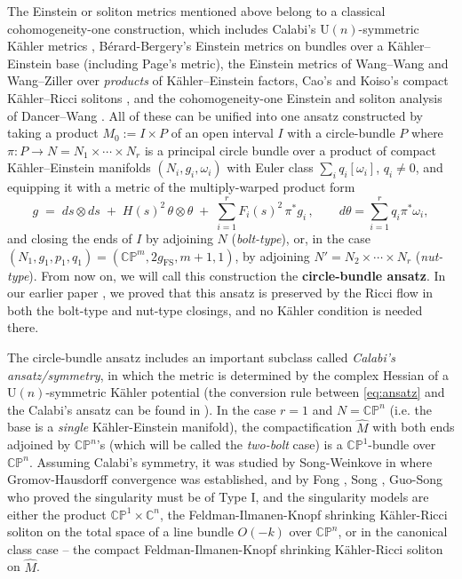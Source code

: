 \documentclass[11pt]{amsart}
\theoremstyle{plain}
\numberwithin{equation}{section}
\theoremstyle{definition}
\theoremstyle{remark}
\begin{document}
The Einstein or soliton metrics mentioned above belong to a classical cohomogeneity-one construction, which includes Calabi's $\mathrm{U} ( n )$-symmetric K\"ahler metrics \cite{Calabi}, B\'erard-Bergery's Einstein metrics on bundles over a K\"ahler--Einstein base \cite{BB} (including Page's metric), the Einstein metrics of Wang--Wang \cite{WW} and Wang--Ziller \cite{WZ} over \emph{products} of K\"ahler--Einstein factors, Cao's and Koiso's compact K\"ahler--Ricci solitons \cite{Cao96, Koiso}, and the cohomogeneity-one Einstein and soliton analysis of Dancer--Wang \cite{DW1998,DW2009,DW2011}. All of these can be unified into one ansatz constructed by taking a product $M_0 := I \times P$ of an open interval $I$ with a circle-bundle $P$ where $\pi : P \to N = N_1 \times \cdots \times N_r$ is a principal circle bundle over a product of compact K\"ahler--Einstein manifolds $(N_i, g_i, \omega_i)$ with Euler class $\sum_i q_i [\omega_i]$, $q_i \not= 0$, and equipping it with a metric of the multiply-warped product form
\begin{equation}
\label{eq:ansatz}\tag{*}
g \;=\; ds \otimes ds \;+\; H ( s )^2\, \theta \otimes \theta \;+\; \sum_{i=1}^r F_i ( s )^2\, \pi^* g_i \,, \qquad d\theta = \sum_{i=1}^r q_i\pi^*\omega_i,
\end{equation}
and closing the ends of $I$ by adjoining $N$ (\emph{bolt-type}), or, in the case $(N_1, g_1, p_1, q_1) = (\mathbb{CP}^m, 2g_{\textrm{FS}}, m+1, 1)$, by adjoining $N' = N_2 \times \cdots \times N_r$ (\emph{nut-type}). From now on, we will call this construction the \textbf{circle-bundle ansatz}. In our earlier paper \cite{FT}, we proved that this ansatz is preserved by the Ricci flow in both the bolt-type and nut-type closings, and no K\"ahler condition is needed there.

The circle-bundle ansatz includes an important subclass called \emph{Calabi's ansatz/symmetry}, in which the metric is determined by the complex Hessian of a $\mathrm{U}(n)$-symmetric K\"ahler potential (the conversion rule between \eqref{eq:ansatz} and the Calabi's ansatz can be found in \cite[Section 2.3]{FT}). In the case $r = 1$ and $N = \mathbb{CP}^n$ (i.e. the base is a \emph{single} K\"ahler-Einstein manifold), the compactification $\widehat{M}$ with both ends adjoined by $\mathbb{CP}^n$'s (which will be called the \emph{two-bolt} case) is a $\mathbb{CP}^1$-bundle over $\mathbb{CP}^n$. Assuming Calabi's symmetry, it was studied by Song-Weinkove in \cite{SW} where Gromov-Hausdorff convergence was established, and by Fong \cite{F}, Song \cite{S}, Guo-Song \cite{GS} who proved the singularity must be of Type I, and the singularity models are either the product $\mathbb{CP}^1 \times \mathbb{C}^n$, the Feldman-Ilmanen-Knopf shrinking K\"ahler-Ricci soliton on the total space of a line bundle $O(-k)$ over $\mathbb{CP}^n$, or in the canonical class case -- the compact Feldman-Ilmanen-Knopf shrinking K\"ahler-Ricci soliton on $\widehat{M}$.
\end{document}
